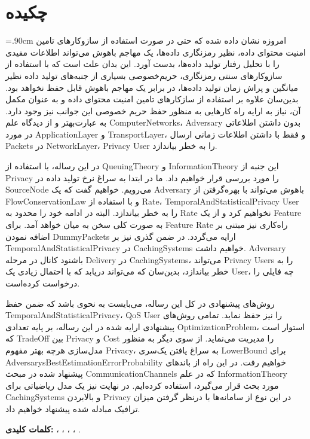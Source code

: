 \clearpage\newpage
\section*{چکیده}
\baselineskip=.90cm
امروزه نشان داده شده که حتی در صورت استفاده از سازوکارهای تامین امنیت محتوای داده، نظیر رمزنگاری داده‌ها، یک مهاجم باهوش می‌تواند اطلاعات مفیدی را با تحلیل رفتار تولید داده‌ها، بدست آورد. این بدان علت است   که با استفاده از سازوکارهای سنتی رمزنگاری، حریم‌خصوصی بسیاری از جنبه‌های تولید داده نظیر میانگین و پراش زمان تولید داده‌ها،  در برابر یک مهاجم باهوش قابل حفظ نخواهد بود. بدین‌سان علاوه بر استفاده از سازکارهای تامین امنیت محتوای داده و به عنوان مکمل آن، نیاز به ارایه راه کارهایی به منظور حفظ حریم خصوصی این جوانب نیز وجود دارد. به عبارت‌بهتر و از دیدگاه علم
\glspl*{ComputerNetwork}، \gls*{Adversary}
بدون داشتن اطلاعاتی در مورد 
\gls*{ApplicationLayer} و \gls*{TransportLayer}،
و فقط با داشتن اطلاعات زمانی ارسال 
\glspl*{Packet} در \gls*{NetworkLayer}، \gls*{Privacy} \gls*{User}
را به خطر بیاندازد. 

در این رساله، با استفاده از 
‎\gls*{QueuingTheory}‎ و \gls*{InformationTheory}
این جنبه از
\gls*{Privacy}
را مورد بررسی قرار خواهیم داد. ما در ابتدا به سراغ نرخ تولید داده در \gls*{SourceNode} می‌رویم. خواهیم گفت که یک
\gls*{Adversary}
باهوش می‌تواند با بهره‌گرفتن از
\gls*{FlowConservationLaw} و با استفاده از \gls*{Rate}، \gls*{TemporalAndStatisticalPrivacy} \gls*{User}
را به خطر بیاندازد. البته در ادامه خود را محدود به 
\gls*{Rate}
نخواهیم کرد و از یک
\gls*{Feature}
به صورت کلی سخن به میان خواهد آمد. برای
\gls*{Feature} \gls*{Rate}
راه‌کاری نیز مبتنی بر اضافه نمودن
\glspl*{DummyPacket}
ارایه می‌گردد. در ضمن گذری نیز بر 
\gls*{TemporalAndStatisticalPrivacy} در \glspl*{CachingSystem}
خواهیم داشت.
\gls*{Adversary} 
باشنود کانال در مرحله
\gls*{Delivery} در \glspl*{CachingSystem}،
می‌تواند 
\gls*{Privacy} \glspl*{User}
را به خطر بیاندازد، بدین‌سان که می‌تواند دریابد که با احتمال زیادی یک
\gls*{User}،
چه فایلی را درخواست کرده‌است. 

روش‌های پیشنهادی در کل این رساله، می‌بایست به نحوی باشد که  ضمن حفظ
\gls*{TemporalAndStatisticalPrivacy}، ‎\gls*{QoS}‎ \gls*{User}
را نیز حفظ نماید. تمامی روش‌های پیشنهادی ارایه شده در این رساله، بر پایه تعدادی
\gls*{OptimizationProblem}،
استوار است که 
\gls*{TradeOff} بین \gls*{Privacy} و \gls*{Cost}
را مدیریت می‌نماید. از سوی دیگر به منظور مدل‌سازی هرچه بهتر مفهوم
\gls*{Privacy}، 
به سراغ یافتن یک‌سری
\gls*{LowerBound} برای \gls*{AdversarysBestEstimationErrorProbability}
خواهیم رفت. در این راه از باندهای پیشنهاد شده در مبحث 
\glspl*{CommunicationChannel} که در علم \gls*{InformationTheory}
مورد بحث قرار می‌گیرد، استفاده کرده‌ایم.
در نهایت نیز یک مدل ریاضیاتی برای
\glspl*{CachingSystem}
و بالابردن
\gls*{Privacy}
در این نوع از سامانه‌ها با درنظر گرفتن میزان ترافیک مبادله شده پیشنهاد خواهیم داد. 

\textbf{کلمات کلیدی:}
 ، 
، 
، 
، 
.




